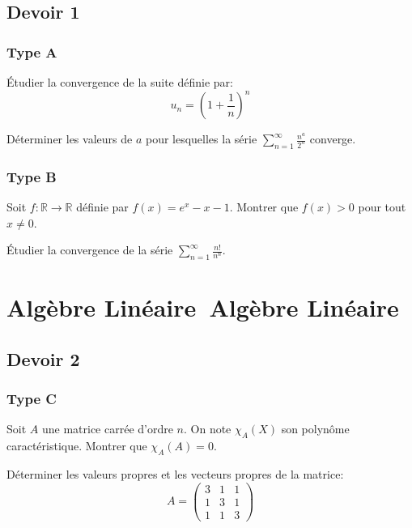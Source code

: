 \documentclass[11pt,%
	fleqn,%
	a4paper,%
	twoside%
]{backagBook}
\def\faVectorSquare{Algèbre Linéaire}%
\begin{document}
\subsection{Devoir 1}

\subsubsection{Type A}
\begin{exercise}
Étudier la convergence de la suite définie par:
\[u_n = \left(1 + \frac{1}{n}\right)^n\]
\end{exercise}

\begin{exercise}
Déterminer les valeurs de $a$ pour lesquelles la série $\sum_{n=1}^{\infty} \frac{n^a}{2^n}$ converge.
\end{exercise}

\subsubsection{Type B}
\begin{exercise}
Soit $f:\mathbb{R} \to \mathbb{R}$ définie par $f(x) = e^x - x - 1$. Montrer que $f(x) > 0$ pour tout $x \neq 0$.
\end{exercise}

\begin{exercise}
Étudier la convergence de la série $\sum_{n=1}^{\infty} \frac{n!}{n^n}$.
\end{exercise}

\section{\protect\faVectorSquare\ Algèbre Linéaire}

\subsection{Devoir 2}
\subsubsection{Type C}
\begin{exercise}
Soit $A$ une matrice carrée d'ordre $n$. On note $\chi_A(X)$ son polynôme caractéristique. Montrer que $\chi_A(A) = 0$.
\end{exercise}

\begin{exercise}
Déterminer les valeurs propres et les vecteurs propres de la matrice:
\[
A = \begin{pmatrix}
3 & 1 & 1 \\
1 & 3 & 1 \\
1 & 1 & 3
\end{pmatrix}
\]
\end{exercise}
\end{document}
